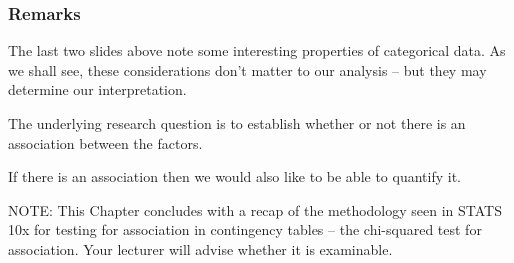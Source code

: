 \documentclass{beamer}\usepackage[]{graphicx}\usepackage[]{xcolor}
\begin{document}
\begin{frame}[fragile]
\frametitle{Remarks}
The last two slides above note some interesting properties of categorical data. As we shall see, these considerations don't matter to our analysis -- but they may determine our interpretation.
\bigskip

The underlying research question is to establish whether or not there is an association between the factors.
\medskip

If there is an association then we would also like to be able to quantify it.

\bigskip \bigskip

NOTE: This Chapter concludes with a recap of the methodology seen in STATS 10x for testing for association in contingency tables -- the chi-squared test for association. Your lecturer will advise whether it is examinable.
\end{frame}



\end{document}
